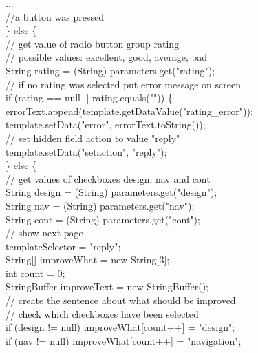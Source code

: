 \begin{java}
...\\
//a button was pressed\\
\} else \{\\
// get value of radio button group rating\\
// possible values: excellent, good, average, bad\\
\jtaba        String rating = (String) parameters.get("rating");\\
\jtaba        // if no rating was selected put error message on screen\\
\jtaba        if (rating == null || rating.equals("")) \{\\
\jtabb                errorText.append(template.getDataValue("rating\_error"));\\
\jtabb                template.setData("error", errorText.toString());\\
\jtabb                // set hidden field action to value "reply"\\
\jtabb                template.setData("setaction", "reply");\\
\jtaba        \} else \{\\
\jtabb                // get values of checkboxes design, nav and cont\\
\jtabb                String design = (String) parameters.get("design");\\
\jtabb                String nav = (String) parameters.get("nav");\\
\jtabb                String cont = (String) parameters.get("cont");\\
\jtabb                // show next page\\
\jtabb                templateSelector = "reply";\\
\jtabb                String[] improveWhat = new String[3];\\
\jtabb                int count = 0;\\
\jtabb                StringBuffer improveText = new StringBuffer();\\
\jtabb                // create the sentence about what should be improved\\
\jtabb                // check which checkboxes have been selected\\
\jtabb                if (design != null) improveWhat[count++] = "design";\\
\jtabb                if (nav != null) improveWhat[count++] = "navigation";\\

\end{java}
